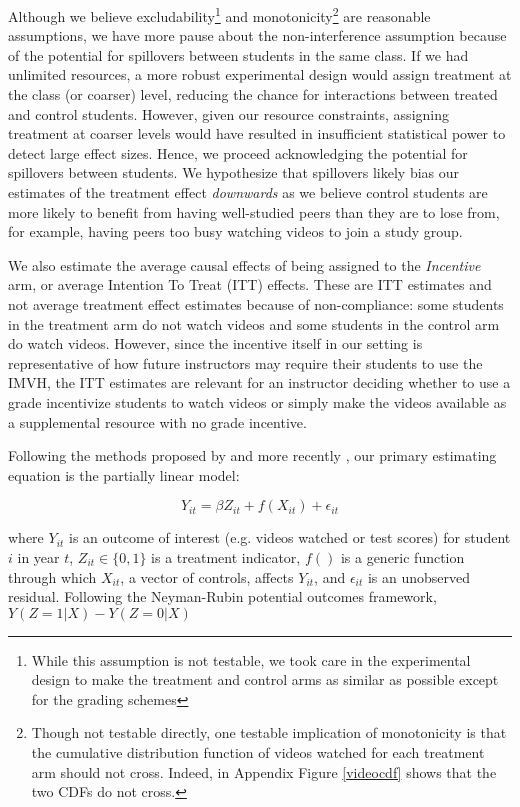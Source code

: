 \documentclass[12pt]{article}
\begin{document}
Although we believe excludability\footnote{While this assumption is not testable, we took care in the experimental design to make the treatment and control arms as similar as possible except for the grading schemes} and monotonicity\footnote{Though not testable directly, one testable implication of monotonicity is that the cumulative distribution function of videos watched for each treatment arm should not cross. Indeed, in Appendix Figure \ref{videocdf} shows that the two CDFs do not cross.} are reasonable assumptions, we have more pause about the non-interference assumption because of the potential for spillovers between students in the same class. If we had unlimited resources, a more robust experimental design would assign treatment at the class (or coarser) level, reducing the chance for interactions between treated and control students. However, given our resource constraints, assigning treatment at coarser levels would have resulted in insufficient statistical power to detect large effect sizes. Hence, we proceed acknowledging the potential for spillovers between students. We hypothesize that spillovers likely bias our estimates of the treatment effect \textit{downwards} as we believe control students are more likely to benefit from having well-studied peers than they are to lose from, for example, having peers too busy watching videos to join a study group.

We also estimate the average causal effects of being assigned to the \textit{Incentive} arm, or average Intention To Treat (ITT) effects. These are ITT estimates and not average treatment effect estimates because of non-compliance: some students in the treatment arm do not watch videos and some students in the control arm do watch videos. However, since the incentive itself in our setting is representative of how future instructors may require their students to use the IMVH, the ITT estimates are relevant for an instructor deciding whether to use a grade incentivize students to watch videos or simply make the videos available as a supplemental resource with no grade incentive.

Following the methods proposed by \textcite{robinson1988} and more recently \textcite{wa2018}, our primary estimating equation is the partially linear model:

\begin{equation}
	Y_{it} = \beta Z_{it} + f(X_{it}) + \epsilon_{it}
\end{equation}

where $Y_{it}$ is an outcome of interest (e.g. videos watched or test scores) for student $i$ in year $t$, $Z_{it} \in \{0,1\}$ is a treatment indicator, $f()$ is a generic function through which $X_{it}$, a vector of controls, affects $Y_{it}$, and $\epsilon_{it}$ is an unobserved residual. Following the Neyman-Rubin potential outcomes framework, $Y(Z=1|X) - Y(Z=0|X)$
\end{document}
